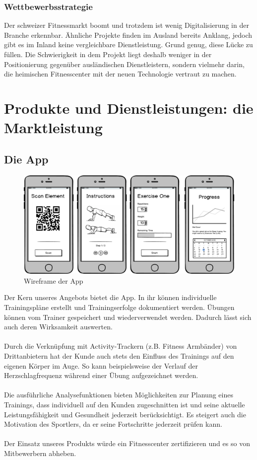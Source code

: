 \subsubsection{Wettbewerbsstrategie}
Der schweizer Fitnessmarkt boomt und trotzdem ist wenig Digitalisierung in der Branche erkennbar. Ähnliche Projekte finden im Ausland bereits Anklang, jedoch gibt es im Inland keine vergleichbare Dienstleistung. Grund genug, diese Lücke zu füllen. Die Schwierigkeit in dem Projekt liegt deshalb weniger in der Positionierung gegenüber ausländischen Dienstleistern, sondern vielmehr darin, die heimischen Fitnesscenter mit der neuen Technologie vertraut zu machen.


\clearpage
\section{Produkte und Dienstleistungen: die Marktleistung}

\subsection{Die App}
\begin{figure}[h]
\centering
\includegraphics[width=0.5\linewidth]{images/app}
\caption{Wireframe der App}
\label{fig:app}
\end{figure}
\noindent Der Kern unseres Angebots bietet die App. In ihr können individuelle Trainingspläne erstellt und Trainingserfolge dokumentiert werden. Übungen können vom Trainer gespeichert und wiederverwendet werden. Dadurch lässt sich auch deren Wirksamkeit auswerten. \\ \\
Durch die Verknüpfung mit Activity-Trackern (z.B. Fitness Armbänder) von Drittanbietern hat der Kunde auch stets den Einfluss des Trainings auf den eigenen Körper im Auge. So kann beispielsweise der Verlauf der Herzschlagfrequenz während einer Übung aufgezeichnet werden. \\ \\
Die ausführliche Analysefunktionen bieten Möglichkeiten zur Planung eines Trainings, dass individuell auf den Kunden zugeschnitten ist und seine aktuelle Leistungsfähigkeit und Gesundheit jederzeit berücksichtigt. Es steigert auch die Motivation des Sportlers, da er seine Fortschritte jederzeit prüfen kann. \\ \\
Der Einsatz unseres Produkts würde ein Fitnesscenter zertifizieren und es so von Mitbewerbern abheben.

